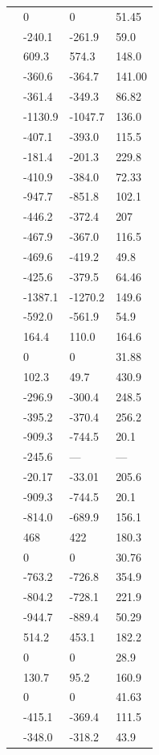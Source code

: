 \begin{supertabular}{llll}
     & 0 & 0 & 51.45 \\
     & -240.1 & -261.9 & 59.0 \\
     & 609.3 & 574.3 & 148.0 \\
     & -360.6 & -364.7 & 141.00 \\
     & -361.4 & -349.3 & 86.82 \\
     & -1130.9 & -1047.7 & 136.0 \\
     & -407.1 & -393.0 & 115.5 \\
     & -181.4 & -201.3 & 229.8 \\
     & -410.9 & -384.0 & 72.33 \\
     & -947.7 & -851.8 & 102.1 \\
     & -446.2 & -372.4 & 207 \\
     & -467.9 & -367.0 & 116.5 \\
     & -469.6 & -419.2 & 49.8 \\
     & -425.6 & -379.5 & 64.46 \\
     & -1387.1 & -1270.2 & 149.6 \\
     & -592.0 & -561.9 & 54.9 \\
     & 164.4 & 110.0 & 164.6 \\
     & 0 & 0 & 31.88 \\
     & 102.3 & 49.7 & 430.9 \\
     & -296.9 & -300.4 & 248.5 \\
     & -395.2 & -370.4 & 256.2 \\
     & -909.3 & -744.5 & 20.1 \\
     & -245.6 & --- & --- \\
     & -20.17 & -33.01 & 205.6 \\
     & -909.3 & -744.5 & 20.1 \\
     & -814.0 & -689.9 & 156.1 \\
     & 468 & 422 & 180.3 \\
     & 0 & 0 & 30.76 \\
     & -763.2 & -726.8 & 354.9 \\
     & -804.2 & -728.1 & 221.9 \\
     & -944.7 & -889.4 & 50.29 \\
     & 514.2 & 453.1 & 182.2 \\
     & 0 & 0 & 28.9 \\
     & 130.7 & 95.2 & 160.9 \\
     & 0 & 0 & 41.63 \\
     & -415.1 & -369.4 & 111.5 \\
     & -348.0 & -318.2 & 43.9 \\
    \hline
\end{supertabular}

